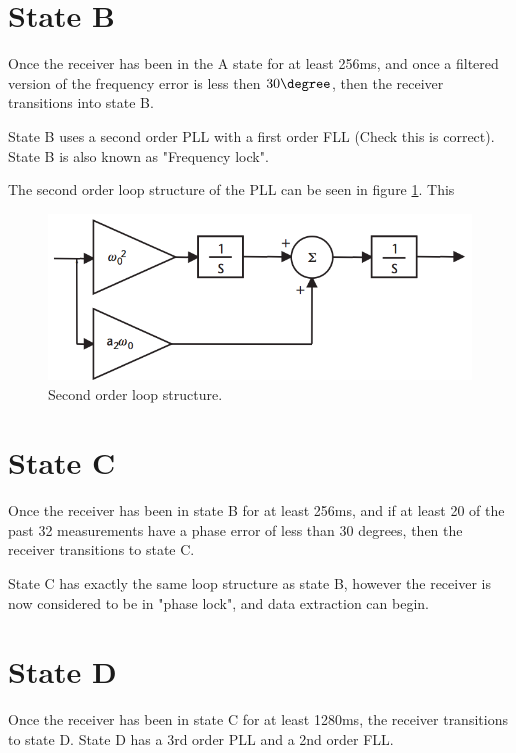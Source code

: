 \section{State B}
Once the receiver has been in the A state for at least 256ms, and once a filtered version of the frequency error is less then $30 \degree$, then the receiver transitions into state B.

State B uses a second order PLL with a first order FLL (Check this is correct). State B is also known as "Frequency lock".

The second order loop structure of the PLL can be seen in figure \ref{fig:SecondOrderLoopKaplan}. This 

\begin{figure}[!htb] 
    \centering
    \includegraphics[width=1\textwidth]{Images/LoopArchitectures/SecondOrderLoop.png}
    \caption{Second order loop structure.}
    \label{fig:SecondOrderLoopKaplan}
\end{figure}


\section{State C}
Once the receiver has been in state B for at least 256ms, and if at least 20 of the past 32 measurements have a phase error of less than 30 degrees, then the receiver transitions to state C.

State C has exactly the same loop structure as state B, however the receiver is now considered to be in "phase lock", and data extraction can begin.

\section{State D}
Once the receiver has been in state C for at least 1280ms, the receiver transitions to state D. State D has a 3rd order PLL and a 2nd order FLL.




